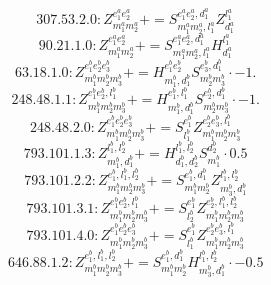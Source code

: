 \documentclass[letterpaper,10pt,fleqn,leqno,onecolumn]{article}
\begin{document}
\begin{equation} \;\;\;\;\;\;  307.53.2.0: Z^{e_{1}^{a}e_{2}^{a}}_{m_{1}^{a}m_{2}^{a}}+=S^{e_{1}^{a}e_{2}^{a},d_{1}^{a}}_{m_{1}^{a}m_{2}^{a},l_{1}^{a}}Z^{l_{1}^{a}}_{d_{1}^{a}} \end{equation}
\begin{equation} \;\;\;\;\;\;  90.21.1.0: Z^{e_{1}^{a}e_{2}^{a}}_{m_{1}^{a}m_{2}^{a}}+=S^{e_{1}^{a}e_{2}^{a},d_{1}^{a}}_{m_{1}^{a}m_{2}^{a},l_{1}^{a}}H^{l_{1}^{a}}_{d_{1}^{a}} \end{equation}
\begin{equation} \;\;\;\;\;\;  63.18.1.0: Z^{e_{1}^{b}e_{2}^{b}e_{3}^{b}}_{m_{1}^{b}m_{2}^{b}m_{3}^{b}}+=H^{e_{1}^{b}e_{2}^{b}}_{m_{1}^{b},d_{1}^{b}}S^{e_{3}^{b},d_{1}^{b}}_{m_{2}^{b}m_{3}^{b}}\cdot -1. \end{equation}
\begin{equation} \;\;\;\;\;\;  248.48.1.1: Z^{e_{1}^{b}e_{2}^{b},l_{1}^{b}}_{m_{1}^{b}m_{2}^{b}m_{3}^{b}}+=H^{e_{1}^{b},l_{1}^{b}}_{m_{1}^{b},d_{1}^{b}}S^{e_{2}^{b},d_{1}^{b}}_{m_{2}^{b}m_{3}^{b}}\cdot -1. \end{equation}
\begin{equation} \;\;\;\;\;\;  248.48.2.0: Z^{e_{1}^{b}e_{2}^{b}e_{3}^{b}}_{m_{1}^{b}m_{2}^{b}m_{3}^{b}}+=S^{e_{1}^{b}}_{l_{1}^{b}}Z^{e_{2}^{b}e_{3}^{b},l_{1}^{b}}_{m_{1}^{b}m_{2}^{b}m_{3}^{b}} \end{equation}
\begin{equation} \;\;\;\;\;\;  793.101.1.3: Z^{l_{1}^{b},l_{2}^{b}}_{m_{1}^{b},d_{1}^{b}}+=H^{l_{1}^{b},l_{2}^{b}}_{d_{1}^{b},d_{2}^{b}}S^{d_{2}^{b}}_{m_{1}^{b}}\cdot 0.5 \end{equation}
\begin{equation} \;\;\;\;\;\;  793.101.2.2: Z^{e_{1}^{b},l_{1}^{b},l_{2}^{b}}_{m_{1}^{b}m_{2}^{b}m_{3}^{b}}+=S^{e_{1}^{b},d_{1}^{b}}_{m_{1}^{b}m_{2}^{b}}Z^{l_{1}^{b},l_{2}^{b}}_{m_{3}^{b},d_{1}^{b}} \end{equation}
\begin{equation} \;\;\;\;\;\;  793.101.3.1: Z^{e_{1}^{b}e_{2}^{b},l_{1}^{b}}_{m_{1}^{b}m_{2}^{b}m_{3}^{b}}+=S^{e_{1}^{b}}_{l_{2}^{b}}Z^{e_{2}^{b},l_{1}^{b},l_{2}^{b}}_{m_{1}^{b}m_{2}^{b}m_{3}^{b}} \end{equation}
\begin{equation} \;\;\;\;\;\;  793.101.4.0: Z^{e_{1}^{b}e_{2}^{b}e_{3}^{b}}_{m_{1}^{b}m_{2}^{b}m_{3}^{b}}+=S^{e_{1}^{b}}_{l_{1}^{b}}Z^{e_{2}^{b}e_{3}^{b},l_{1}^{b}}_{m_{1}^{b}m_{2}^{b}m_{3}^{b}} \end{equation}
\begin{equation} \;\;\;\;\;\;  646.88.1.2: Z^{e_{1}^{b},l_{1}^{b},l_{2}^{b}}_{m_{1}^{b}m_{2}^{b}m_{3}^{b}}+=S^{e_{1}^{b},d_{1}^{b}}_{m_{1}^{b}m_{2}^{b}}H^{l_{1}^{b},l_{2}^{b}}_{m_{3}^{b},d_{1}^{b}}\cdot -0.5 \end{equation}
\end{document}
